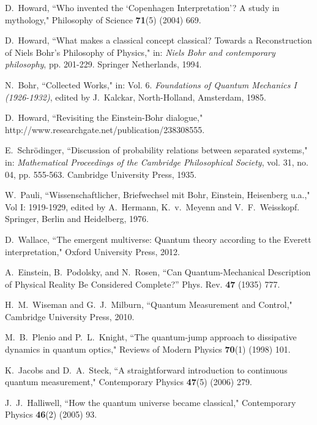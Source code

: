 \documentclass[12pt]{article}
\theoremstyle{plain}
\theoremstyle{definition}
\theoremstyle{remark}
\begin{document}
\begin{thebibliography}{99}
 
 
D.~Howard, ``Who invented the `Copenhagen Interpretation'? A study in mythology,"   Philosophy of Science {\bf 71}(5) (2004) 669.

 
 
D.~Howard, ``What makes a classical concept classical? Towards a Reconstruction of Niels Bohr's Philosophy of Physics," in: {\it Niels Bohr and contemporary philosophy\/}, pp. 201-229. Springer Netherlands, 1994.
 

N.~Bohr, ``Collected Works," in: Vol. 6. {\sl Foundations of Quantum Mechanics I (1926-1932)\/}, edited by J.~Kalckar, North-Holland, Amsterdam, 1985.

D.~Howard, ``Revisiting the Einstein-Bohr dialogue," http://www.researchgate.net/publication/238308555. 

E.~Schr\"odinger, ``Discussion of probability relations between separated systems," in: {\it Mathematical Proceedings of the Cambridge Philosophical Society\/}, vol. 31, no. 04, pp. 555-563. Cambridge University Press, 1935.
 
W.~Pauli, ``Wissenschaftlicher, Briefwechsel mit Bohr, Einstein, Heisenberg u.a.," Vol I: 1919-1929, edited by A.~Hermann, K.~v.~Meyenn and V.~F.~Weisskopf. Springer, Berlin and Heidelberg, 1976.
 
D.~Wallace, ``The emergent multiverse: Quantum theory according to the Everett interpretation,"   Oxford University Press, 2012. 
  
A.~Einstein, B.~Podolsky, and N.~Rosen, ``Can Quantum-Mechanical Description of Physical Reality Be
  Considered Complete?'' Phys. Rev. {\bf47} (1935) 777.

 H.~M.~Wiseman and G.~J.~Milburn, ``Quantum Measurement and Control," Cambridge University Press, 2010.

M.~B.~Plenio and P.~L.~Knight, ``The quantum-jump approach to dissipative dynamics in quantum optics,"   Reviews of Modern Physics {\bf70}(1) (1998) 101.

K.~Jacobs and D.~A.~Steck, ``A straightforward introduction to continuous quantum measurement,"   Contemporary Physics {\bf47}(5) (2006) 279.

J.~J.~Halliwell, ``How the quantum universe became classical," Contemporary Physics {\bf46}(2) (2005) 93.


\end{thebibliography}
\end{document}
